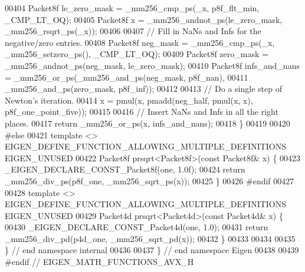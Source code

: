 \begin{DoxyCode}
00404   Packet8f le\_zero\_mask = \_mm256\_cmp\_ps(\_x, p8f\_flt\_min, \_CMP\_LT\_OQ);
00405   Packet8f x = \_mm256\_andnot\_ps(le\_zero\_mask, \_mm256\_rsqrt\_ps(\_x));
00406 
00407   \textcolor{comment}{// Fill in NaNs and Infs for the negative/zero entries.}
00408   Packet8f neg\_mask = \_mm256\_cmp\_ps(\_x, \_mm256\_setzero\_ps(), \_CMP\_LT\_OQ);
00409   Packet8f zero\_mask = \_mm256\_andnot\_ps(neg\_mask, le\_zero\_mask);
00410   Packet8f infs\_and\_nans = \_mm256\_or\_ps(\_mm256\_and\_ps(neg\_mask, p8f\_nan),
00411                                         \_mm256\_and\_ps(zero\_mask, p8f\_inf));
00412 
00413   \textcolor{comment}{// Do a single step of Newton's iteration.}
00414   x = pmul(x, pmadd(neg\_half, pmul(x, x), p8f\_one\_point\_five));
00415 
00416   \textcolor{comment}{// Insert NaNs and Infs in all the right places.}
00417   \textcolor{keywordflow}{return} \_mm256\_or\_ps(x, infs\_and\_nans);
00418 \}
00419 
00420 \textcolor{preprocessor}{#else}
00421 \textcolor{keyword}{template} <> EIGEN\_DEFINE\_FUNCTION\_ALLOWING\_MULTIPLE\_DEFINITIONS EIGEN\_UNUSED
00422 Packet8f prsqrt<Packet8f>(\textcolor{keyword}{const} Packet8f& x) \{
00423   \_EIGEN\_DECLARE\_CONST\_Packet8f(one, 1.0f);
00424   \textcolor{keywordflow}{return} \_mm256\_div\_ps(p8f\_one, \_mm256\_sqrt\_ps(x));
00425 \}
00426 \textcolor{preprocessor}{#endif}
00427 
00428 \textcolor{keyword}{template} <> EIGEN\_DEFINE\_FUNCTION\_ALLOWING\_MULTIPLE\_DEFINITIONS EIGEN\_UNUSED
00429 Packet4d prsqrt<Packet4d>(\textcolor{keyword}{const} Packet4d& x) \{
00430   \_EIGEN\_DECLARE\_CONST\_Packet4d(one, 1.0);
00431   \textcolor{keywordflow}{return} \_mm256\_div\_pd(p4d\_one, \_mm256\_sqrt\_pd(x));
00432 \}
00433 
00434 
00435 \}  \textcolor{comment}{// end namespace internal}
00436 
00437 \}  \textcolor{comment}{// end namespace Eigen}
00438 
00439 \textcolor{preprocessor}{#endif  // EIGEN\_MATH\_FUNCTIONS\_AVX\_H}
\end{DoxyCode}
